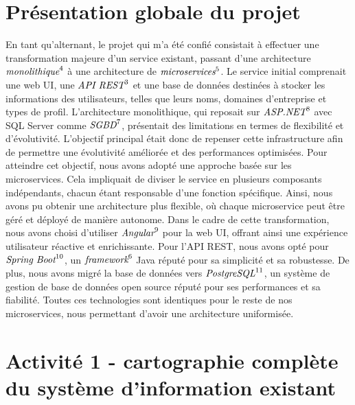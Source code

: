 \documentclass[a4paper, 11pt]{report}
\begin{document}
\section{Présentation globale du projet}
En tant qu'alternant, le projet qui m'a été confié consistait à effectuer une transformation majeure d'un service existant, passant d'une architecture $\emph{monolithique}^4$ à une architecture de $\emph{microservices}^5$.
Le service initial comprenait une web UI, une $\emph{API REST}^3$ et une base de données destinées à stocker les informations des utilisateurs, telles que leurs noms, domaines d'entreprise et types de profil.
L'architecture monolithique, qui reposait sur $\emph{ASP.NET}^8$ avec SQL Server comme $\emph{SGBD}^7$, présentait des limitations en termes de flexibilité et d'évolutivité.
L'objectif principal était donc de repenser cette infrastructure afin de permettre une évolutivité améliorée et des performances optimisées.
Pour atteindre cet objectif, nous avons adopté une approche basée sur les microservices.
Cela impliquait de diviser le service en plusieurs composants indépendants, chacun étant responsable d'une fonction spécifique.
Ainsi, nous avons pu obtenir une architecture plus flexible, où chaque microservice peut être géré et déployé de manière autonome.
Dans le cadre de cette transformation, nous avons choisi d'utiliser $\emph{Angular}^9$ pour la web UI, offrant ainsi une expérience utilisateur réactive et enrichissante.
Pour l'API REST, nous avons opté pour $\emph{Spring Boot}^{10}$, un $\emph{framework}^6$ Java réputé pour sa simplicité et sa robustesse.
De plus, nous avons migré la base de données vers $\emph{PostgreSQL}^{11}$, un système de gestion de base de données open source réputé pour ses performances et sa fiabilité.
Toutes ces technologies sont identiques pour le reste de nos microservices, nous permettant d’avoir une architecture uniformisée.

\section{Activité 1 - cartographie complète du système d'information existant}
\end{document}

